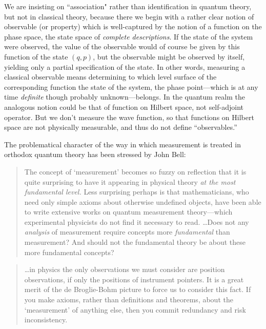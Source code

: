 \documentclass[12pt]{article}
\begin{document}
We are insisting on ``association" rather than identification in
quantum theory, but not in classical theory, because there we begin
with a rather clear notion of observable (or property) which is
well-captured by the notion of a function on the phase space, the
state space of {\it complete descriptions}.  If the state of the
system were observed, the value of the observable would of course be
given by this function of the state $(q,p)$, but the observable might
be observed by itself, yielding only a partial specification of the
state.  In other words, measuring a classical observable means
determining to which level surface of the corresponding function the
state of the system, the phase point---which is at any time {\it
   definite} though probably unknown---belongs.  In the quantum realm
the analogous notion could be that of function on Hilbert space, not
self-adjoint operator.  But we don't measure the wave function, so
that functions on Hilbert space are not physically measurable, and
thus do not define ``observables.''  \medskip

The problematical character of the way in which measurement is treated
in orthodox quantum theory has been stressed by John Bell:


\begin{quotation}\setlength{\baselineskip}{12pt}\noindent
   The concept of `measurement' becomes so fuzzy on reflection that it
   is quite surprising to have it appearing in physical theory {\it at
     the most fundamental level.\/} Less surprising perhaps is that
   mathematicians, who need only simple axioms about otherwise
   undefined objects, have been able to write extensive works on
   quantum measurement theory---which experimental physicists do not
   find it necessary to read. \dots Does not any {\it analysis\/} of
   measurement require concepts more {\it fundamental\/} than
   measurement?  And should not the fundamental theory be about these
   more fundamental concepts?~\cite{Bel81}
\end{quotation}

\begin{quotation}\setlength{\baselineskip}{12pt}\noindent
   \dots in physics the only observations we must consider are position
   observations, if only the positions of instrument pointers.  It is a
   great merit of the de Broglie-Bohm picture to force us to consider
   this fact.  If you make axioms, rather than definitions and
   theorems, about the `measurement' of anything else, then you commit
   redundancy and risk inconsistency.~\cite{Bel82}
\end{quotation}
%
\end{document}
